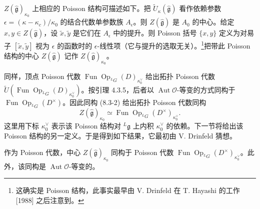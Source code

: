 $Z(\hat{\mathfrak g})_{\kappa_0}$ 上相应的 Poisson 结构可描述如下。把 $\widetilde U_\kappa(\hat{\mathfrak g})$ 看作依赖参数 $\epsilon=(\kappa-\kappa_c)/\kappa_0$ 的结合代数单参数族 $A_\epsilon$。则 $Z(\hat{\mathfrak g})$ 是 $A_0$ 的中心。给定 $x,y\in Z(\hat{\mathfrak g})$，设 $\widetilde x,\widetilde y$ 是它们在 $A_\epsilon$ 中的提升。则 Poisson 括号 $\{x,y\}$ 定义为对易子 $[\widetilde x,\widetilde y]$ 视为 $\epsilon$ 的函数时的 $\epsilon$-线性项（它与提升的选取无关）。\footnote{这确实是 Poisson 结构，此事实最早由 V. Drinfeld 在 T. Hayashi 的工作 [1988] 之后注意到。}把带此 Poisson 结构的中心 $Z(\hat{\mathfrak g})$ 记作 $Z(\hat{\mathfrak g})_{\kappa_0}$。

同样，顶点 Poisson 代数 $\operatorname{Fun}\operatorname{Op}_{{}^LG}(D)_{\kappa^\vee_0}$ 给出拓扑 Poisson 代数 $\widetilde U(\operatorname{Fun}\operatorname{Op}_{{}^LG}(D)_{\kappa^\vee_0})$。按引理 4.3.5，后者以 $\operatorname{Aut}\mathcal O$-等变的方式同构于 $\operatorname{Fun}\operatorname{Op}_{{}^LG}(D^\times)$。因此同构 (8.3-2) 给出拓扑 Poisson 代数同构
\[
    Z(\hat{\mathfrak g})_{\kappa_0}\simeq\operatorname{Fun}\operatorname{Op}_{{}^LG}(D^\times)_{\kappa^\vee_0}.
\]
这里用下标 $\kappa^\vee_0$ 表示该 Poisson 结构对 ${}^L\mathfrak g$ 上内积 $\kappa^\vee_0$ 的依赖。下一节将给出该 Poisson 结构的另一定义。于是得到如下结果，它最初由 V. Drinfeld 猜想。

\begin{theorem}
    作为 Poisson 代数，中心 $Z(\hat{\mathfrak g})_{\kappa_0}$ 同构于 Poisson 代数 $\operatorname{Fun}\operatorname{Op}_{{}^LG}(D^\times)_{\kappa^\vee_0}$。此外，该同构是 $\operatorname{Aut}\mathcal O$-等变的。
\end{theorem}


